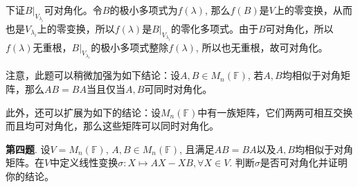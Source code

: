 下证$B|_{V_{\lambda_i}}$可对角化。令$B$的极小多项式为$f(\lambda)$, 那么$f(B)$是$V$上的零变换，从而也是$V_{\lambda_i}$上的零变换，所以$f(\lambda)$是$B|_{V_{\lambda_i}}$的零化多项式。由于$B$可对角化，所以$f(\lambda)$无重根，$B|_{V_{\lambda_i}}$的极小多项式整除$f(\lambda)$, 所以也无重根，故可对角化。

注意，此题可以稍微加强为如下结论：设$A, B \in M_n(\mathbb{F})$, 若$A,B$均相似于对角矩阵，那么$AB=BA$当且仅当$A,B$可同时对角化。

此外，还可以扩展为如下的结论：设$M_n(\mathbb{F})$中有一族矩阵，它们两两可相互交换而且均可对角化，那么这些矩阵可以同时对角化。


\newpageorvspace


{\bf 第四题}. 设$V = M_n (\mathbb{F})$, $A,B \in M_n (\mathbb{F})$, 且满足$AB=BA$以及$A,B$均相似于对角矩阵。在$V$中定义线性变换$\sigma: X \mapsto AX - XB, \forall X \in V$. 判断$\sigma$是否可对角化并证明你的结论。

